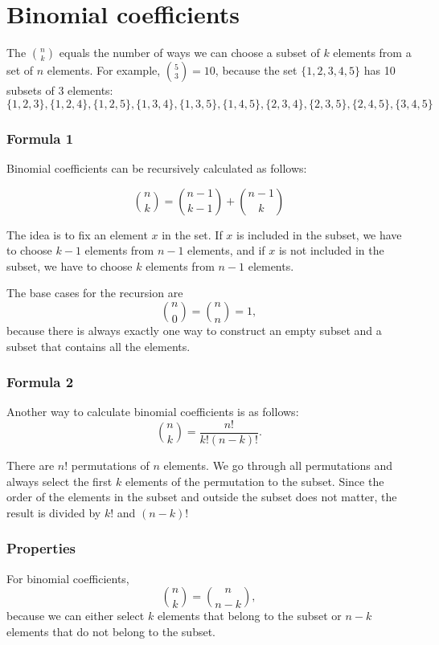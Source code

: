 \section{Binomial coefficients}


The  ${n \choose k}$
equals the number of ways we can choose a subset
of $k$ elements from a set of $n$ elements.
For example, ${5 \choose 3}=10$,
because the set $\{1,2,3,4,5\}$
has 10 subsets of 3 elements:
\[ \{1,2,3\}, \{1,2,4\}, \{1,2,5\}, \{1,3,4\}, \{1,3,5\}, 
\{1,4,5\}, \{2,3,4\}, \{2,3,5\}, \{2,4,5\}, \{3,4,5\} \]

\subsubsection{Formula 1}

Binomial coefficients can be
recursively calculated as follows:

\[
{n \choose k}  =  {n-1 \choose k-1} + {n-1 \choose k}
\]

The idea is to fix an element $x$ in the set.
If $x$ is included in the subset,
we have to choose $k-1$
elements from $n-1$ elements,
and if $x$ is not included in the subset,
we have to choose $k$ elements from $n-1$ elements.

The base cases for the recursion are
\[
{n \choose 0}  =  {n \choose n} = 1,
\]
because there is always exactly
one way to construct an empty subset
and a subset that contains all the elements.

\subsubsection{Formula 2}

Another way to calculate binomial coefficients is as follows:
\[
{n \choose k}  =  \frac{n!}{k!(n-k)!}.
\]

There are $n!$ permutations of $n$ elements.
We go through all permutations and always
select the first $k$ elements of the permutation
to the subset.
Since the order of the elements in the subset
and outside the subset does not matter,
the result is divided by $k!$ and $(n-k)!$

\subsubsection{Properties}

For binomial coefficients,
\[
{n \choose k}  =  {n \choose n-k},
\]
because we can either select $k$
elements that belong to the subset
or $n-k$ elements that
do not belong to the subset.

